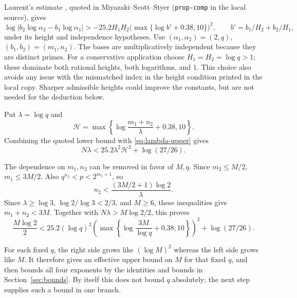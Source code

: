 \documentclass[11pt]{article}
\begin{document}
Laurent's estimate \cite[Corollary 2]{Laurent}, quoted in Miyazaki--Scott--Styer
\cite{MSS} (\texttt{prop-comp} in the local source), gives
\[
\log|b_2\log\alpha_2-b_1\log\alpha_1|
>-25.2H_1H_2\bigl(\max\{\log b'+0.38,10\}\bigr)^2,
\qquad b'=b_1/H_2+b_2/H_1,
\]
under its height and independence hypotheses.
Use $(\alpha_1,\alpha_2)=(2,q)$, $(b_1,b_2)=(m_1,n_2)$.
The bases are multiplicatively independent because they are distinct primes.
For a conservative application choose $H_1=H_2=\log q>1$;
these dominate both rational heights, both logarithms, and $1$.
This choice also avoids any issue with the mismatched index in the height
condition printed in the local copy. Sharper admissible heights could
improve the constants, but are not needed for the deduction below.

Put $\lambda=\log q$ and
\[
\mathcal H=\max\left\{\log\frac{m_1+n_2}{\lambda}+0.38,10\right\}.
\]
Combining the quoted lower bound with \eqref{eq:lambda-upper} gives
\begin{equation}\label{eq:baker-gap}
N\lambda<25.2\lambda^2\mathcal H^2+\log(27/26).
\end{equation}

The dependence on $m_1,n_2$ can be removed in favor of $M,q$.
Since $m_2\leq M/2$, $m_1\leq3M/2$. Also
$q^{n_2}<p<2^{m_1+1}$, so
\[
n_2<\frac{(3M/2+1)\log2}{\lambda}.
\]
Since $\lambda\geq\log3$, $\log2/\log3<2/3$, and $M\geq6$,
these inequalities give $m_1+n_2<3M$.
Together with $N\lambda>M\log2/2$, this proves
\begin{equation}\label{eq:baker-M}
\boxed{
\frac{M\log2}{2}
<25.2(\log q)^2
\left(\max\left\{\log\frac{3M}{\log q}+0.38,10\right\}\right)^2
+\log(27/26).}
\end{equation}

For each fixed $q$, the right side grows like $(\log M)^2$ whereas the
left side grows like $M$. It therefore gives an effective upper bound
on $M$ for that fixed $q$, and then bounds all four exponents by the
identities and bounds in Section~\ref{sec:bounds}. By itself this does not bound $q$
absolutely; the next step supplies such a bound in one branch.
\end{document}
